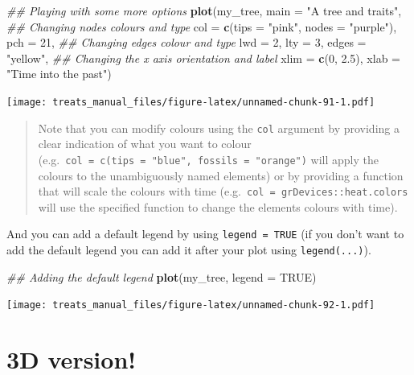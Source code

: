 \documentclass[
]{book}
\newenvironment{Shaded}{\begin{snugshade}}{\end{snugshade}}
\newcommand{\CommentTok}[1]{\textcolor[rgb]{0.56,0.35,0.01}{\textit{#1}}}
\newcommand{\DataTypeTok}[1]{\textcolor[rgb]{0.13,0.29,0.53}{#1}}
\newcommand{\DecValTok}[1]{\textcolor[rgb]{0.00,0.00,0.81}{#1}}
\newcommand{\FloatTok}[1]{\textcolor[rgb]{0.00,0.00,0.81}{#1}}
\newcommand{\KeywordTok}[1]{\textcolor[rgb]{0.13,0.29,0.53}{\textbf{#1}}}
\newcommand{\NormalTok}[1]{#1}
\newcommand{\OtherTok}[1]{\textcolor[rgb]{0.56,0.35,0.01}{#1}}
\newcommand{\StringTok}[1]{\textcolor[rgb]{0.31,0.60,0.02}{#1}}
\begin{document}
\begin{Shaded}
\begin{Highlighting}[]
\CommentTok{\#\# Playing with some more options}
\KeywordTok{plot}\NormalTok{(my\_tree, }\DataTypeTok{main =} \StringTok{"A tree and traits"}\NormalTok{,}
     \CommentTok{\#\# Changing nodes colours and type}
     \DataTypeTok{col =} \KeywordTok{c}\NormalTok{(}\DataTypeTok{tips =} \StringTok{"pink"}\NormalTok{, }\DataTypeTok{nodes =} \StringTok{"purple"}\NormalTok{), }\DataTypeTok{pch =} \DecValTok{21}\NormalTok{,}
     \CommentTok{\#\# Changing edges colour and type}
     \DataTypeTok{lwd =} \DecValTok{2}\NormalTok{, }\DataTypeTok{lty =} \DecValTok{3}\NormalTok{, }\DataTypeTok{edges =} \StringTok{"yellow"}\NormalTok{,}
     \CommentTok{\#\# Changing the x axis orientation and label}
     \DataTypeTok{xlim =} \KeywordTok{c}\NormalTok{(}\DecValTok{0}\NormalTok{, }\FloatTok{2.5}\NormalTok{), }\DataTypeTok{xlab =} \StringTok{"Time into the past"}\NormalTok{)}
\end{Highlighting}
\end{Shaded}

\texttt{[image: treats\_manual\_files/figure-latex/unnamed-chunk-91-1.pdf]}

\begin{quote}
Note that you can modify colours using the \texttt{col} argument by providing a clear indication of what you want to colour (e.g.~\texttt{col\ =\ c(tips\ =\ "blue",\ fossils\ =\ "orange")} will apply the colours to the unambiguously named elements) or by providing a function that will scale the colours with time (e.g.~\texttt{col\ =\ grDevices::heat.colors} will use the specified function to change the elements colours with time).
\end{quote}

And you can add a default legend by using \texttt{legend\ =\ TRUE} (if you don't want to add the default legend you can add it after your plot using \texttt{legend(...)}).

\begin{Shaded}
\begin{Highlighting}[]
\CommentTok{\#\# Adding the default legend}
\KeywordTok{plot}\NormalTok{(my\_tree, }\DataTypeTok{legend =} \OtherTok{TRUE}\NormalTok{)}
\end{Highlighting}
\end{Shaded}

\texttt{[image: treats\_manual\_files/figure-latex/unnamed-chunk-92-1.pdf]}

\hypertarget{d-version}{%
\section{3D version!}\label{d-version}}
\end{document}

